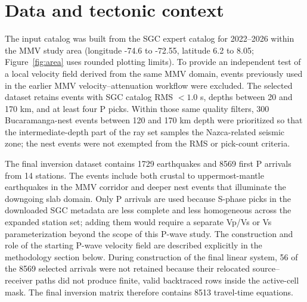 \documentclass[review,authoryear]{elsarticle}
\begin{document}
\section{Data and tectonic context}
The input catalog was built from the SGC expert catalog for 2022--2026 within the MMV study area (longitude -74.6 to -72.55, latitude 6.2 to 8.05; Figure~\ref{fig:area} uses rounded plotting limits). To provide an independent test of a local velocity field derived from the same MMV domain, events previously used in the earlier MMV velocity--attenuation workflow were excluded. The selected dataset retains events with SGC catalog RMS $<1.0$ s, depths between 20 and 170 km, and at least four P picks. Within those same quality filters, 300 Bucaramanga-nest events between 120 and 170 km depth were prioritized so that the intermediate-depth part of the ray set samples the Nazca-related seismic zone; the nest events were not exempted from the RMS or pick-count criteria.

The final inversion dataset contains 1729 earthquakes and 8569 first P arrivals from 14 stations. The events include both crustal to uppermost-mantle earthquakes in the MMV corridor and deeper nest events that illuminate the downgoing slab domain. Only P arrivals are used because S-phase picks in the downloaded SGC metadata are less complete and less homogeneous across the expanded station set; adding them would require a separate Vp/Vs or Vs parameterization beyond the scope of this P-wave study. The construction and role of the starting P-wave velocity field are described explicitly in the methodology section below. During construction of the final linear system, 56 of the 8569 selected arrivals were not retained because their relocated source--receiver paths did not produce finite, valid backtraced rows inside the active-cell mask. The final inversion matrix therefore contains 8513 travel-time equations.

\begin{table}[t]
\centering
\caption{Data independence between the earlier MMV velocity--attenuation workflow and the present relocation--tomography test.}
\label{tab:data_independence}
\end{table}
\end{document}

